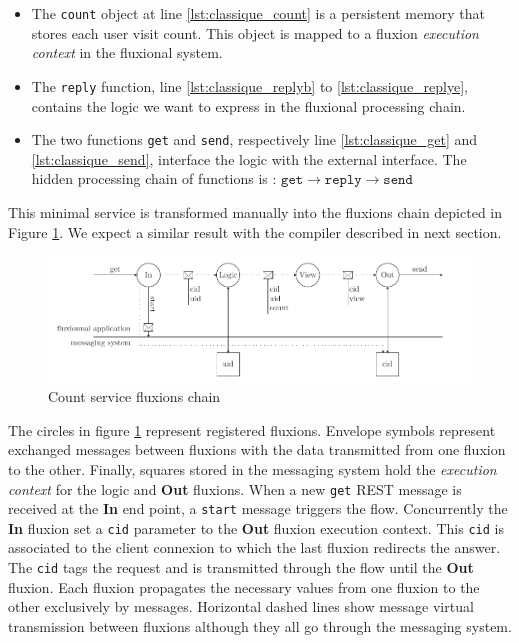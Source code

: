 \begin{itemize}
  \item The \texttt{count} object at line \ref{lst:classique_count} is a persistent memory that stores each user visit count.
  This object is mapped to a fluxion \textit{execution context} in the fluxional system.
  \item The \texttt{reply} function, line \ref{lst:classique_replyb} to \ref{lst:classique_replye}, contains the logic we want to express in the fluxional processing chain.
  \item The two functions \texttt{get} and \texttt{send}, respectively line \ref{lst:classique_get} and \ref{lst:classique_send}, interface the logic with the external interface.
  The hidden processing chain of functions is : $\texttt{get} \to \texttt{reply} \to \texttt{send}$
\end{itemize}

This minimal service is transformed manually into the fluxions chain depicted in Figure \ref{fig:fluxions}.
We expect a similar result with the compiler described in next section.

\begin{figure}[h!]
  \includegraphics[width=\linewidth]{ressources/flux.pdf}
  \caption{Count service fluxions chain}
  \label{fig:fluxions}
\end{figure}

The circles in figure \ref{fig:fluxions} represent registered fluxions.
Envelope symbols represent exchanged messages between fluxions with the data transmitted from one fluxion to the other. Finally, squares stored in the messaging system hold the \textit{execution context} for the logic and \textbf{Out} fluxions.
When a new \texttt{get} REST message is received at the \textbf{In} end point, a \texttt{start} message triggers the flow.
Concurrently the \textbf{In} fluxion set a \texttt{cid} parameter to the \textbf{Out} fluxion execution context.
This \texttt{cid} is associated to the client connexion to which the last fluxion redirects the answer.
The \texttt{cid} tags the request and is transmitted through the flow until the \textbf{Out} fluxion.
Each fluxion propagates the necessary values from one fluxion to the other exclusively by messages.
Horizontal dashed lines show message virtual transmission between fluxions although they all go through the messaging system.


